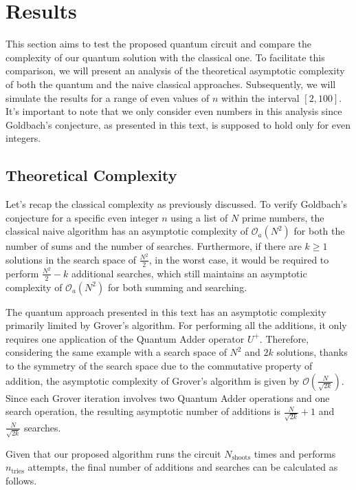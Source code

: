 \documentclass[aps,prapplied,longbibliography]{article}
\begin{document}
    \section{Results}

    This section aims to test the proposed quantum circuit and compare the complexity of our quantum solution with the classical one. To facilitate this comparison, we will present an analysis of the theoretical asymptotic complexity of both the quantum and the naive classical approaches. Subsequently, we will simulate the results for a range of even values of $n$ within the interval $[2,100]$. It's important to note that we only consider even numbers in this analysis since Goldbach's conjecture, as presented in this text, is supposed to hold only for even integers.

    \subsection{Theoretical Complexity}

    Let's recap the classical complexity as previously discussed. To verify Goldbach's conjecture for a specific even integer $n$ using a list of $N$ prime numbers, the classical naive algorithm has an asymptotic complexity of $\mathcal{O}_a(N^2)$ for both the number of sums and the number of searches. Furthermore, if there are $k\geq 1$ solutions in the search space of $\frac{N^2}{2}$, in the worst case, it would be required to perform $\frac{N^2}{2}- k$ additional searches, which still maintains an asymptotic complexity of $\mathcal{O}_a(N^2)$ for both summing and searching.
    
    The quantum approach presented in this text has an asymptotic complexity primarily limited by Grover's algorithm. For performing all the additions, it only requires one application of the Quantum Adder operator $U^+$. Therefore, considering the same example with a search space of $N^2$ and $2k$ solutions, thanks to the symmetry of the search space due to the commutative property of addition, the asymptotic complexity of Grover's algorithm is given by $\mathcal{O}\left(\frac{N}{\sqrt{2k}}\right)$. Since each Grover iteration involves two Quantum Adder operations and one search operation, the resulting asymptotic number of additions is $\frac{N}{\sqrt{2k}} + 1$ and $\frac{N}{\sqrt{2k}}$ searches.

    Given that our proposed algorithm runs the circuit $N_{\text{shoots}}$ times and performs $n_{\text{tries}}$ attempts, the final number of additions and searches can be calculated as follows.
\end{document}
